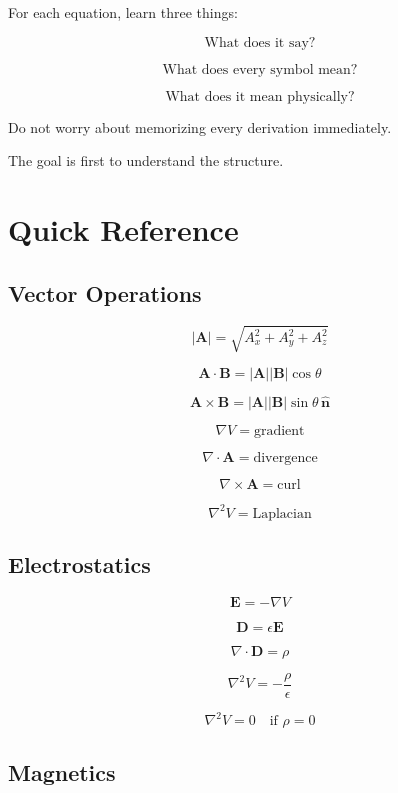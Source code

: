 \documentclass[11pt]{article}
\newcommand{\vect}[1]{\mathbf{#1}}
\begin{document}
For each equation, learn three things:

\[
\boxed{
\text{What does it say?}
}
\]

\[
\boxed{
\text{What does every symbol mean?}
}
\]

\[
\boxed{
\text{What does it mean physically?}
}
\]

Do not worry about memorizing every derivation immediately.

The goal is first to understand the structure.



\section{Quick Reference}

\subsection*{Vector Operations}

\[
\boxed{
|\vect{A}|
=
\sqrt{A_x^2+A_y^2+A_z^2}
}
\]

\[
\boxed{
\vect{A}\cdot\vect{B}
=
|\vect{A}||\vect{B}|\cos\theta
}
\]

\[
\boxed{
\vect{A}\times\vect{B}
=
|\vect{A}||\vect{B}|\sin\theta\,\hat{\vect{n}}
}
\]

\[
\boxed{
\nabla V
=
\text{gradient}
}
\]

\[
\boxed{
\nabla\cdot\vect{A}
=
\text{divergence}
}
\]

\[
\boxed{
\nabla\times\vect{A}
=
\text{curl}
}
\]

\[
\boxed{
\nabla^2V
=
\text{Laplacian}
}
\]

\subsection*{Electrostatics}

\[
\boxed{
\vect{E}
=
-\nabla V
}
\]

\[
\boxed{
\vect{D}
=
\epsilon\vect{E}
}
\]

\[
\boxed{
\nabla\cdot\vect{D}
=
\rho
}
\]

\[
\boxed{
\nabla^2V
=
-\frac{\rho}{\epsilon}
}
\]

\[
\boxed{
\nabla^2V=0
\quad
\text{if }
\rho=0
}
\]

\subsection*{Magnetics}
\end{document}
